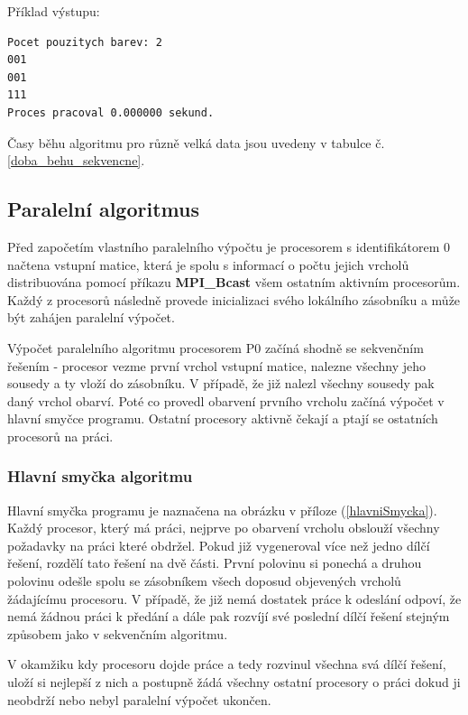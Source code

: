 \documentclass[12pt]{article}
\begin{document}
Příklad výstupu:
\begin{verbatim}
Pocet pouzitych barev: 2
001
001
111
Proces pracoval 0.000000 sekund.
\end{verbatim}

Časy běhu algoritmu pro různě velká data jsou uvedeny v tabulce č. \ref{doba_behu_sekvencne}.

\subsection{Paralelní algoritmus}

Před započetím vlastního paralelního výpočtu je procesorem s identifikátorem 0 načtena vstupní matice, která je spolu s informací o počtu jejich vrcholů distribuována pomocí příkazu \textbf{MPI\_Bcast} všem ostatním aktivním procesorům. Každý z procesorů následně provede inicializaci svého lokálního zásobníku a může být zahájen paralelní výpočet.

Výpočet paralelního algoritmu procesorem P0 začíná shodně se sekvenčním řešením - procesor vezme první vrchol vstupní matice, nalezne všechny jeho sousedy a ty vloží do zásobníku. V případě, že již nalezl všechny sousedy pak daný vrchol obarví. Poté co provedl obarvení prvního vrcholu začíná výpočet v hlavní smyčce programu. Ostatní procesory aktivně čekají a ptají se ostatních procesorů na práci.

\subsubsection{Hlavní smyčka algoritmu}

Hlavní smyčka programu je naznačena na obrázku v příloze (\ref{hlavniSmycka}). Každý procesor, který má práci, nejprve po obarvení vrcholu obslouží všechny požadavky na práci které obdržel. Pokud již vygeneroval více než jedno dílčí řešení, rozdělí tato řešení na dvě části. První polovinu si ponechá a druhou polovinu odešle spolu se zásobníkem všech doposud objevených vrcholů žádajícímu procesoru. V případě, že již nemá dostatek práce k odeslání odpoví, že nemá žádnou práci k předání a dále pak rozvíjí své poslední dílčí řešení stejným způsobem jako v sekvenčním algoritmu.

V okamžiku kdy procesoru dojde práce a tedy rozvinul všechna svá dílčí řešení, uloží si nejlepší z nich a postupně žádá všechny ostatní procesory o práci dokud ji neobdrží nebo nebyl paralelní výpočet ukončen.
\end{document}
